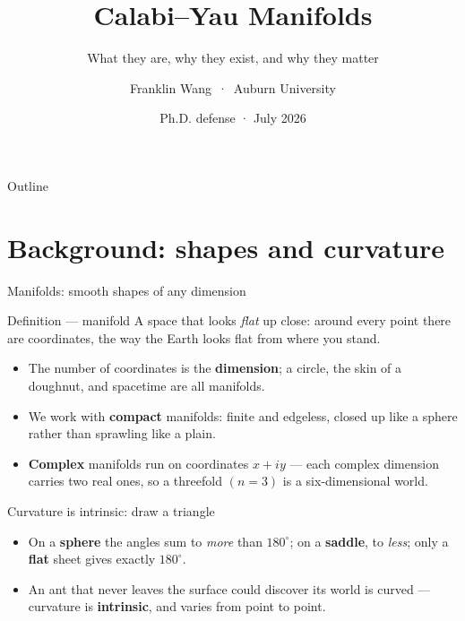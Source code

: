 \documentclass[aspectratio=169]{beamer}
\title[Calabi–Yau Manifolds]{Calabi–Yau Manifolds}
\subtitle{What they are, why they exist, and why they matter}
\author[F. Wang]{Franklin Wang\, · \,Auburn University}
\date{Ph.D. defense · July 2026}
\begin{document}
\CYtitleframe

\begin{frame}{Outline}
  \vspace{0.4em}
  \tableofcontents
\end{frame}

\section{Background: shapes and curvature}

\begin{frame}{Manifolds: smooth shapes of any dimension}
  \begin{block}{Definition — manifold}
    A space that looks \emph{flat} up close: around every point there are
    coordinates, the way the Earth looks flat from where you stand.
  \end{block}
  \begin{itemize}
    \item The number of coordinates is the \textbf{dimension}; a circle,
          the skin of a doughnut, and spacetime are all manifolds.
    \item We work with \textbf{compact} manifolds: finite and edgeless,
          closed up like a sphere rather than sprawling like a plain.
    \item \textbf{Complex} manifolds run on coordinates $x + iy$ —
          each complex dimension carries two real ones, so a threefold
          $(n = 3)$ is a six-dimensional world.
  \end{itemize}
\end{frame}

\begin{frame}{Curvature is intrinsic: draw a triangle}
  \vspace{0.5em}
  \begin{itemize}
    \item On a \textbf{sphere} the angles sum to \emph{more} than $180^\circ$;
          on a \textbf{saddle}, to \emph{less}; only a \textbf{flat} sheet
          gives exactly $180^\circ$.
    \item An ant that never leaves the surface could discover its world is
          curved — curvature is \textbf{intrinsic}, and varies from point to point.
  \end{itemize}
\end{frame}
\end{document}
